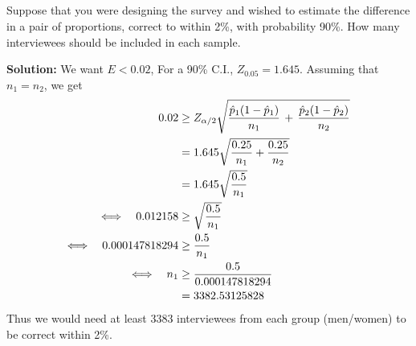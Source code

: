\subsection{}
    Suppose that you were designing the survey and wished to estimate the difference in a pair of proportions, correct to within 2\%, with probability 90\%.  How many interviewees should be included in each sample.
    \begin{mybox}
        \textbf{Solution: } We want $E < 0.02$, For a 90\% C.I., $Z_{0.05} = 1.645$. Assuming that $n_1 = n_2$, we get
        \begin{align}
            0.02 &\geq Z_{\alpha/2}\sqrt{ \frac{\hat{p}_1(1-\hat{p}_1)}{n_1}   \, + \, \frac{\hat{p}_2(1-\hat{p}_2)}{n_2}  } \notag\\
            &= 1.645 \sqrt{\frac{0.25}{n_1}+ \frac{0.25}{n_2}} \notag\\
            &= 1.645 \sqrt{\frac{0.5}{n_1}}\notag\\
            \Longleftrightarrow \quad 0.012158 &\geq  \sqrt{\frac{0.5}{n_1}}\notag\\
            \Longleftrightarrow \quad 0.000147818294 &\geq  \frac{0.5}{n_1}\notag\\
            \Longleftrightarrow \quad n_1  &\geq  \frac{0.5}{0.000147818294}\notag\\
            &= 3382.53125828 \notag
        \end{align}
        Thus we would need at least 3383 interviewees from each group (men/women) to be correct within 2\%.
    \end{mybox}